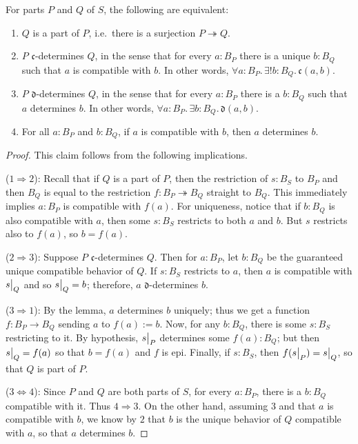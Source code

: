 \begin{prop}\label{Things:lem:Determines.Mereology}
For parts $P$ and $Q$ of $S$, the following are equivalent:
\begin{enumerate}
    \item $Q$ is a part of $P$, i.e.\ there is a surjection $P\twoheadrightarrow Q$.
    \item $P$ $\mathfrak{c}$-determines $Q$, in the sense that for every $a : B_P$ there is a unique $b : B_Q$ such that $a$ is compatible with $b$.  In other words, $\forall a : B_P.\, \exists! b : B_Q.\, \mathfrak{c}(a, b)$.
    \item $P$ $\mathfrak{d}$-determines $Q$, in the sense that for every $a : B_P$ there is a $b : B_Q$ such that $a$ determines $b$. In other words, $\forall a : B_P.\, \exists b : B_Q.\, \mathfrak{d}(a, b)$.
    \item For all $a : B_P$ and $b : B_Q$, if $a$ is compatible with $b$, then $a$ determines $b$.
\end{enumerate}
\end{prop}
\begin{proof}
This claim follows from the following implications.

($1 \Rightarrow 2$): Recall that if $Q$ is a part of $P$, then the restriction of $s : B_S$ to $B_P$ and then $B_Q$ is equal to the restriction $f : B_P \twoheadrightarrow B_Q$ straight to $B_Q$. This immediately implies $a : B_P$ is compatible with $f(a)$. For uniqueness, notice that if $b : B_Q$ is also compatible with $a$, then some $s : B_S$ restricts to both $a$ and $b$. But $s$ restricts also to $f(a)$, so $b = f(a)$.
    
($2 \Rightarrow 3$): Suppose $P$ $\mathfrak{c}$-determines $Q$. Then for $a : B_P$, let $b : B_Q$ be the guaranteed unique compatible behavior of $Q$. If $s : B_S$ restricts to $a$, then $a$ is compatible with $s\big|_{Q}$ and so $s\big|_{Q} = b$; therefore, $a$ $\mathfrak{d}$-determines $b$.
    
($3 \Rightarrow 1$): By the lemma, $a$ determines $b$ uniquely; thus we get a function $f : B_P \to B_Q$ sending $a$ to $f(a) := b$. Now, for any $b : B_Q$, there is some $s : B_S$ restricting to it. By hypothesis, $s\big|_{P}$ determines some $f(a) : B_Q$; but then $s\big|_{Q} = f(a)$ so that $b = f(a)$ and $f$ is epi. Finally, if $s : B_S$, then $f(s\big|_{P}) = s\big|_{Q}$, so that $Q$ is part of $P$.
    
($3 \Leftrightarrow 4$): Since $P$ and $Q$ are both parts of $S$, for every $a : B_P$, there is a $b :B_Q$ compatible with it. Thus $4 \Rightarrow 3$. On the other hand, assuming $3$ and that $a$ is compatible with $b$, we know by $2$ that $b$ is the unique behavior of $Q$ compatible with $a$, so that $a$ determines $b$. \qedhere
\end{proof}

